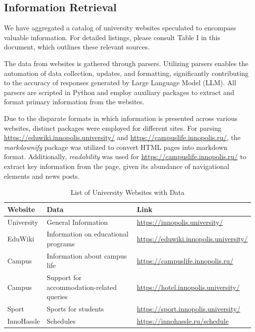 \documentclass[conference, 11pt]{IEEEtran}
\begin{document}
\subsection{Information Retrieval}

We have aggregated a catalog of university websites speculated to encompass valuable information. For detailed listings, please consult Table I in this document, which outlines these relevant sources.

The data from websites is gathered through parsers. Utilizing parsers enables the automation of data collection, updates, and formatting, significantly contributing to the accuracy of responses generated by Large Language Model (LLM). All parsers are scripted in Python and employ auxiliary packages to extract and format primary information from the websites.

Due to the disparate formats in which information is presented across various websites, distinct packages were employed for different sites. For parsing \url{https://eduwiki.innopolis.university/} and \url{https://campuslife.innopolis.ru/}, the \textit{markdownify} package was utilized to convert HTML pages into markdown format. Additionally, \textit{readability} was used for \url{https://campuslife.innopolis.ru/} to extract key information from the page, given its abundance of navigational elements and news posts.

\begin{table}[t] %
\caption{List of University Websites with Data}
\centering
\begin{tabular}{|l|l|l|}
\hline
\textbf{Website} & \textbf{Data} & \textbf{Link} \\
\hline
University & General Information & \url{https://innopolis.university/} \\
EduWiki & Information on educational programs & \url{https://eduwiki.innopolis.university/} \\
Campus & Information about campus life & \url{https://campuslife.innopolis.ru/} \\
Campus & Support for accommodation-related queries & \url{https://hotel.innopolis.university/} \\
Sport & Sports for students & \url{https://sport.innopolis.university/} \\
InnoHassle & Schedules & \url{https://innohassle.ru/schedule} \\
\hline
\end{tabular}
\label{tab:university_websites}
\end{table}
\end{document}
